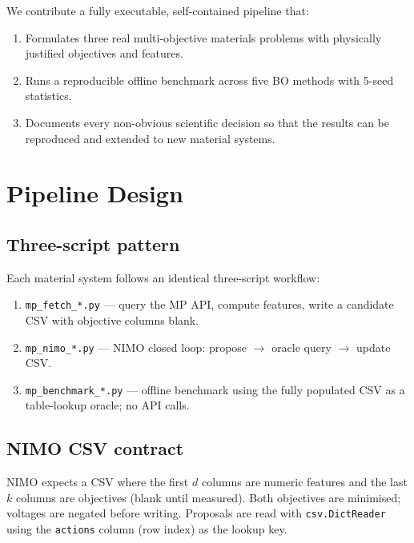 \documentclass[10pt,twocolumn]{article}
\begin{document}
We contribute a fully executable, self-contained pipeline that:
\begin{enumerate}
  \item Formulates three real multi-objective materials problems with physically
        justified objectives and features.
  \item Runs a reproducible offline benchmark across five BO methods with
        5-seed statistics.
  \item Documents every non-obvious scientific decision so that the results can
        be reproduced and extended to new material systems.
\end{enumerate}

\section{Pipeline Design}

\subsection{Three-script pattern}

Each material system follows an identical three-script workflow:
\begin{enumerate}
  \item \texttt{mp\_fetch\_*.py} --- query the MP API, compute features,
        write a candidate CSV with objective columns blank.
  \item \texttt{mp\_nimo\_*.py} --- NIMO closed loop: propose $\to$ oracle
        query $\to$ update CSV.
  \item \texttt{mp\_benchmark\_*.py} --- offline benchmark using the fully
        populated CSV as a table-lookup oracle; no API calls.
\end{enumerate}

\subsection{NIMO CSV contract}

NIMO expects a CSV where the first $d$ columns are numeric features and the
last $k$ columns are objectives (blank until measured).
Both objectives are minimised; voltages are negated before writing.
Proposals are read with \texttt{csv.DictReader} using the \texttt{actions}
column (row index) as the lookup key.

\end{document}
